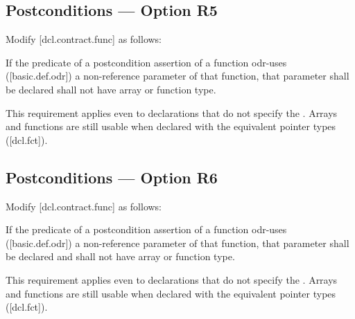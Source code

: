 \subsection*{Postconditions --- Option R5}

Modify [dcl.contract.func] as follows:

\begin{adjustwidth}{0.5cm}{0.5cm}
If the predicate of a postcondition assertion of a function odr-uses ([basic.def.odr]) a
non-reference parameter of that function, that parameter shall be declared \added{, }shall not have array or function type.
\begin{note}
This requirement applies even to declarations
that do not specify the . Arrays and functions are still usable when declared with the equivalent pointer types ([dcl.fct]).
\end{note}
\begin{example}
\tcode{[...]}
\end{example}
\end{adjustwidth}

\subsection*{Postconditions --- Option R6}

Modify [dcl.contract.func] as follows:

\begin{adjustwidth}{0.5cm}{0.5cm}
If the predicate of a postcondition assertion of a function odr-uses ([basic.def.odr]) a
non-reference parameter of that function, that parameter shall be declared  and shall not have array or function type.
\begin{note}
This requirement applies even to declarations
that do not specify the . Arrays and functions are still usable when declared with the equivalent pointer types ([dcl.fct]).
\end{note}
\begin{example}
\tcode{[...]}
\end{example}
\end{adjustwidth}

